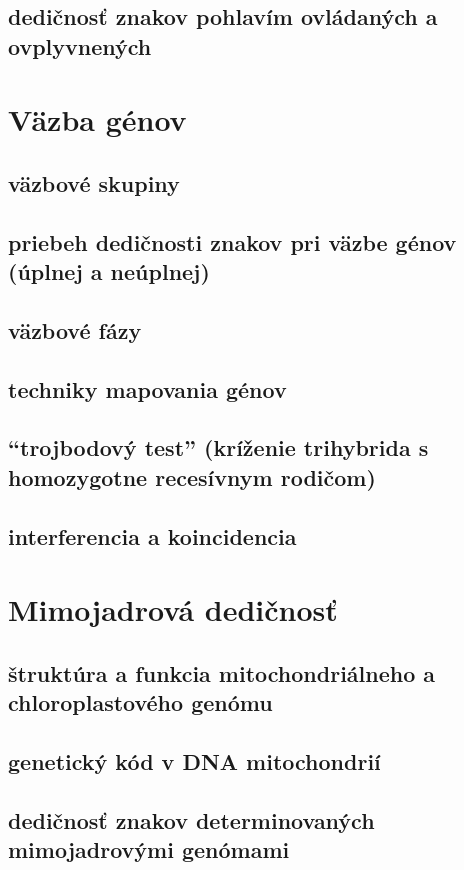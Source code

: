 \subsection{dedičnosť znakov pohlavím ovládaných a ovplyvnených}

\section{Väzba génov}
\subsection{väzbové skupiny}
\subsection{priebeh dedičnosti znakov pri väzbe génov (úplnej a neúplnej)}
\subsection{väzbové fázy}
\subsection{techniky mapovania génov}
\subsection{“trojbodový test” (kríženie trihybrida s homozygotne recesívnym rodičom)}
\subsection{interferencia a koincidencia}

\section{Mimojadrová dedičnosť}
\subsection{štruktúra a funkcia mitochondriálneho a chloroplastového genómu}
\subsection{genetický kód v DNA mitochondrií}
\subsection{dedičnosť znakov determinovaných mimojadrovými genómami}
